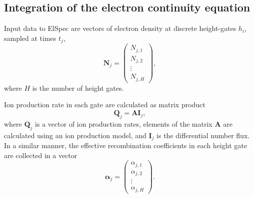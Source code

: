 \documentclass[12pt,a4paper]{report}
\begin{document}
\subsection{Integration of the electron continuity equation}

Input data to ElSpec are vectors of electron density at discrete height-gates $h_i$, sampled at times $t_j$, 
\begin{equation}
\bm{N}_j = \left(
\begin{array}{c}
N_{j,1}\\
N_{j,2}\\
\vdots \\
N_{j,H}
\end{array}
\right),
\end{equation}
where $H$ is the number of height gates. 

Ion production rate in each gate are calculated as matrix product
\begin{equation}
\bm{Q}_j = \bm{A}\bm{I}_j,
\end{equation}
where $\bm{Q}_j$ is a vector of ion production rates, elements of the matrix $\bm{A}$ are calculated using an ion production model, and $\bm{I}_j$ is the differential number flux. In a similar manner, the effective recombination coefficients in each height gate are collected in a vector
\begin{equation}
\bm{\alpha}_j = \left(
\begin{array}{c}
\alpha_{j,1}\\
\alpha_{j,2}\\
\vdots\\
\alpha_{j,H}
\end{array}
\right).
\end{equation}
\end{document}
